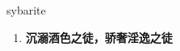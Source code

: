 
\begin{frame}
{\huge sybarite}
\begin{center}
\begin{enumerate}\Large
  \item \textbf{沉溺酒色之徒，骄奢淫逸之徒}
\end{enumerate}
\end{center}
\end{frame}
